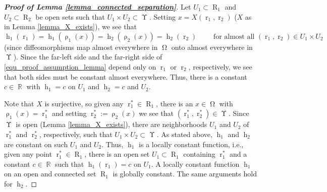 \documentclass[10pt,a4paper]{amsart}
\DeclareMathOperator{\RR}{{\mathbb{R}}}
\DeclareMathOperator{\Xgroundset}{\Upsilon}
\DeclareMathOperator{\imgdom}{{\Omega}}
\DeclareMathOperator{\raygroundset}{R}
\DeclareMathOperator{\rayinverse}{\rho}
\DeclareMathOperator{\rayvariable}{r}
\DeclareMathOperator{\stripfkt}{h}
\begin{document}
\begin{proof}[\textbf{Proof of Lemma \ref{lemma_connected_separation}}]

Let $U_1\subset \raygroundset_1$ and $U_2\subset \raygroundset_2$  be open sets such that $U_1\times U_2\subset \Xgroundset$.
Setting $x=X(\rayvariable_1,\rayvariable_2)$ ($X$ as in Lemma \ref{lemma_X_exists}), we see that 
\begin{equation} \label{equ_proof_assumption_lemma}
 \stripfkt_1(\rayvariable_1)= \stripfkt_1(\rayinverse_1(x))= \stripfkt_2(\rayinverse_2(x))= \stripfkt_2(\rayvariable_2) \qquad \text{ for almost all  $(\rayvariable_1,\rayvariable_2)\in U_1\times U_2$}
 \end{equation}
 (since diffeomorphisms map almost everywhere in $\imgdom$ onto almost everywhere in $\Xgroundset$). Since the far-left  side and the far-right side of \eqref{equ_proof_assumption_lemma} depend only on $\rayvariable_1$ or $\rayvariable_2$, respectively, we see that both sides must be constant almost everywhere. Thus, there is a constant $c\in \RR$ with $\stripfkt_1=c$ on $U_1$ and $\stripfkt_2=c$ and $U_2$.
 
Note that $X$ is surjective, so given any $\rayvariable_1^*\in \raygroundset_1$, there is an $x\in \imgdom$ with $\rayinverse_1(x)=\rayvariable_1^*$ and setting $\rayvariable_2^*:=\rayinverse_2(x)$ we see that $(\rayvariable_1^*,\rayvariable_2^*)\in \Xgroundset$. Since $\Xgroundset$ is open (Lemma \ref{lemma_X_exists}), there are neighborhoods $U_1$ and $U_2$ of $\rayvariable_1^*$ and $\rayvariable_2^*$, respectively, such that $U_1\times U_2\subset \Xgroundset$.
As stated above, $\stripfkt_1$ and $\stripfkt_2$ are constant on such $U_1$ and $U_2$. Thus, $\stripfkt_1$ is a locally constant function, i.e., given any point $\rayvariable_1^* \in \raygroundset_1$, there is an open set $U_1\subset \raygroundset_1$ containing $\rayvariable_1^*$ and a constant $c\in \RR$ such that $\stripfkt_1(\rayvariable_1)=c$ on $U_1$.
A locally constant function $\stripfkt_1$ on an
open and connected set $\raygroundset_1$ is globally constant. The same arguments hold for $\stripfkt_2$.
\end{proof}
\end{document}
